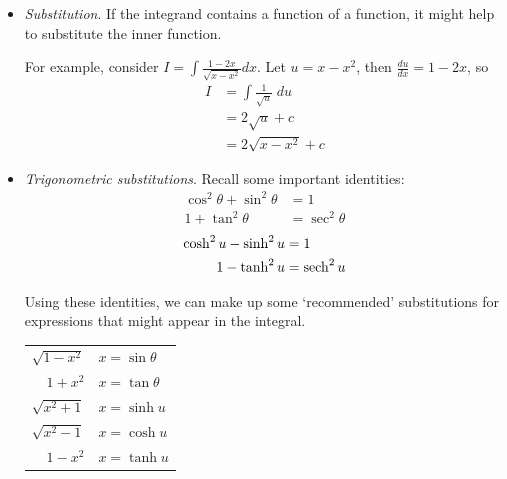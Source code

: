 \documentclass{../template/note}
\begin{document}
    \begin{itemize}
        \item \emph{Substitution}. If the integrand contains a function of a function, it might help to substitute the inner function.
        
        For example, consider \(I = \int \frac{1-2x}{\sqrt{x-x^2}} dx\). Let \(u=x-x^2\), then \(\frac{du}{dx} = 1-2x\), so
        \begin{align*}
            I &= \int \frac{1}{\sqrt u}\; du \\
            &= 2\sqrt u + c \\
            &= 2\sqrt{x-x^2} + c
        \end{align*}

        \item \emph{Trigonometric substitutions}. Recall some important identities:
        \begin{align*}
            \cos^2 \theta + \sin^2 \theta &= 1 \\
            1 + \tan^2 \theta &= \sec^2 \theta 
        \end{align*}
        \begin{align*}
            \cosh^2 u - \sinh^2 u &= 1 \\
            1 - \tanh^2 u &= \operatorname{sech}^2 u
        \end{align*}

        Using these identities, we can make up some `recommended' substitutions for expressions that might appear in the integral.

        \begin{center}
        
            \begin{tabular}{r l}
                \(\sqrt{1-x^2}\) & \(x = \sin \theta\) \\
                \(1 + x^2\) & \(x = \tan \theta\) \\
                \(\sqrt{x^2 + 1}\) & \(x = \sinh u\) \\
                \(\sqrt{x^2 - 1}\) & \(x = \cosh u\) \\
                \(1-x^2\) & \(x = \tanh u\) \\
            \end{tabular}
            
        \end{center}
        

\end{itemize}
\end{document}
